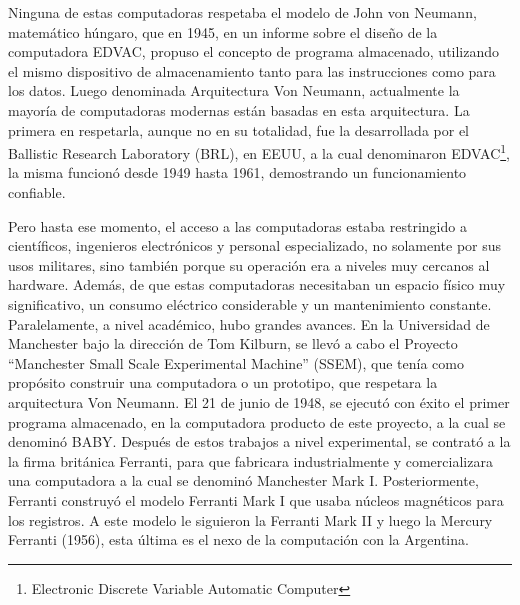 \documentclass[%
 	final,
%
	notitlepage,
	narroweqnarray,
	inline,
 	twoside,
	]{ieee}
\begin{document}
Ninguna de estas computadoras respetaba el modelo de John von Neumann, matem\'atico h\'ungaro, que en 1945, en un informe sobre el dise\~no de la computadora EDVAC, propuso el concepto de programa almacenado, utilizando el mismo dispositivo de almacenamiento tanto para las instrucciones como para los datos. Luego denominada Arquitectura Von Neumann\cite{newman}, actualmente la mayor\'ia de computadoras modernas est\'an basadas en esta arquitectura.
La primera en respetarla, aunque no en su totalidad, fue la desarrollada por el Ballistic Research Laboratory (BRL), en EEUU, a la cual denominaron EDVAC\footnote{Electronic Discrete Variable Automatic Computer\cite{edvac}}, la misma funcion\'o desde 1949 hasta 1961, demostrando un funcionamiento confiable.

Pero hasta ese momento, el acceso a las computadoras estaba restringido a cient\'ificos, ingenieros electr\'onicos y personal especializado, no solamente por sus usos militares, sino tambi\'en porque su operaci\'on era a niveles muy cercanos al hardware. Adem\'as, de que estas computadoras necesitaban un espacio f\'isico muy significativo, un consumo el\'ectrico considerable y un mantenimiento constante.
Paralelamente, a nivel acad\'emico, hubo grandes avances. En la Universidad de Manchester bajo la direcci\'on de Tom Kilburn, se llev\'o a cabo el Proyecto “Manchester Small Scale Experimental Machine” (SSEM), que ten\'ia como prop\'osito construir una computadora o un prototipo, que respetara la arquitectura Von Neumann. El 21 de junio de 1948, se ejecut\'o con \'exito el primer programa almacenado, en la computadora producto de este proyecto, a la cual se denomin\'o BABY.
Despu\'es de estos trabajos a nivel experimental, se contrat\'o a la la firma brit\'anica Ferranti\cite{ferranti}, para que fabricara industrialmente y comercializara una computadora a la cual se denomin\'o Manchester Mark I\cite{mark1}.
Posteriormente, Ferranti construy\'o el modelo Ferranti Mark I que usaba n\'ucleos magn\'eticos para los registros. A este modelo le siguieron la Ferranti Mark II y luego la Mercury Ferranti (1956), esta \'ultima es el nexo de la computaci\'on con la Argentina.
\end{document}
